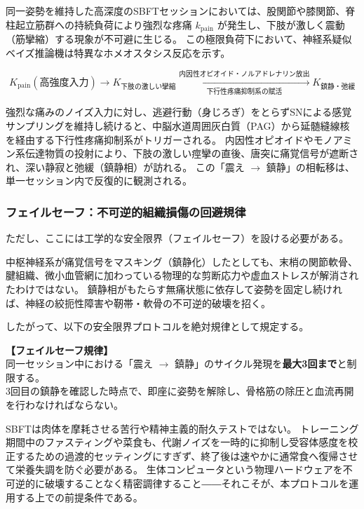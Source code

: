 同一姿勢を維持した高深度のSBFTセッションにおいては、股関節や膝関節、脊柱起立筋群への持続負荷により強烈な疼痛 $k_{\mathrm{pain}}$ が発生し、下肢が激しく震動（筋攣縮）する現象が不可避に生じる。
この極限負荷下において、神経系疑似ベイズ推論機は特異なホメオスタシス反応を示す。

\begin{equation}
    K_{\mathrm{pain}} (\text{高強度入力}) 
    \longrightarrow K_{\text{下肢の激しい攣縮}}
    \xrightarrow[\text{下行性疼痛抑制系の賦活}]{\text{内因性オピオイド・ノルアドレナリン放出}} K_{\text{鎮静・弛緩}}
\end{equation}

強烈な痛みのノイズ入力に対し、逃避行動（身じろぎ）をとらずSNによる感覚サンプリングを維持し続けると、中脳水道周囲灰白質（PAG）から延髄縫線核を経由する下行性疼痛抑制系がトリガーされる。
内因性オピオイドやモノアミン系伝達物質の投射により、下肢の激しい痙攣の直後、唐突に痛覚信号が遮断され、深い静寂と弛緩（鎮静相）が訪れる。
この「震え $\longrightarrow$ 鎮静」の相転移は、単一セッション内で反復的に観測される。

\subsubsection{フェイルセーフ：不可逆的組織損傷の回避規律}
ただし、ここには工学的な安全限界（フェイルセーフ）を設ける必要がある。

中枢神経系が痛覚信号をマスキング（鎮静化）したとしても、末梢の関節軟骨、腱組織、微小血管網に加わっている物理的な剪断応力や虚血ストレスが解消されたわけではない。
鎮静相がもたらす無痛状態に依存して姿勢を固定し続ければ、神経の絞扼性障害や靭帯・軟骨の不可逆的破壊を招く。

したがって、以下の安全限界プロトコルを絶対規律として規定する。
\begin{center}
\textbf{【フェイルセーフ規律】}\\
同一セッション中における「震え $\longrightarrow$ 鎮静」のサイクル発現を\textbf{最大3回まで}と制限する。\\
3回目の鎮静を確認した時点で、即座に姿勢を解除し、骨格筋の除圧と血流再開を行わなければならない。
\end{center}

SBFTは肉体を摩耗させる苦行や精神主義的耐久テストではない。
トレーニング期間中のファスティングや菜食も、代謝ノイズを一時的に抑制し受容体感度を校正するための過渡的セッティングにすぎず、終了後は速やかに通常食へ復帰させて栄養失調を防ぐ必要がある。
生体コンピュータという物理ハードウェアを不可逆的に破壊することなく精密調律すること――それこそが、本プロトコルを運用する上での前提条件である。

